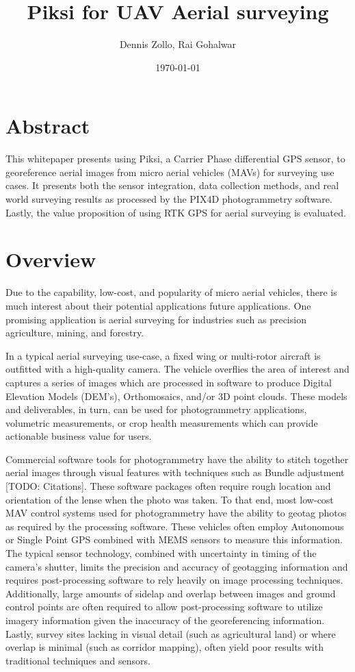 \documentclass{article}
\title{Piksi for UAV Aerial surveying}
\author{Dennis Zollo, Rai Gohalwar}
\date{\today}
\begin{document}
\maketitle

\thispagestyle{firstpage}

\section{Abstract}
\label{sec:abstract}
This whitepaper presents using Piksi, a Carrier Phase differential GPS sensor, to georeference aerial images from micro aerial vehicles (MAVs) for surveying use cases.
It presents both the sensor integration, data collection methods, and real world surveying results as processed by the PIX4D photogrammetry software.  Lastly, the value proposition of using RTK GPS for aerial surveying is evaluated.
\tableofcontents
\newpage
\section{Overview}
\label{sec:Overview}
Due to the capability, low-cost, and popularity of micro aerial vehicles, there is much interest about their potential applications future applications. One promising application is aerial surveying for industries such as precision agriculture, mining, and forestry.

In a typical aerial surveying use-case, a fixed wing or multi-rotor aircraft is outfitted with a high-quality camera.  The vehicle overflies the area of interest and captures a series of images which are processed in software to produce Digital Elevation Models (DEM's), Orthomosaics, and/or 3D point clouds.  These models and deliverables, in turn, can be used for photogrammetry applications, volumetric measurements, or crop health measurements which can provide actionable business value for users.

Commercial software tools for photogrammetry have the ability to stitch together aerial images through visual features with techniques such as Bundle adjustment [TODO: Citations].  These software packages often require rough location and orientation of the lense when the photo was taken. To that end, most low-cost MAV control systems used for photogrammetry have the ability to geotag photos as required by the processing software. These vehicles often employ Autonomous or Single Point GPS combined with MEMS sensors to measure this information.  The typical sensor technology, combined with uncertainty in timing of the camera's shutter, limits the precision and accuracy of geotagging information and requires post-processing software to rely heavily on image processing techniques. Additionally, large amounts of sidelap and overlap between images and ground control points are often required to allow post-processing software to utilize imagery information given the inaccuracy of the georeferencing information.  Lastly, survey sites lacking in visual detail (such as agricultural land) or where overlap is minimal (such as corridor mapping), often yield poor results with traditional techniques and sensors.
\end{document}
